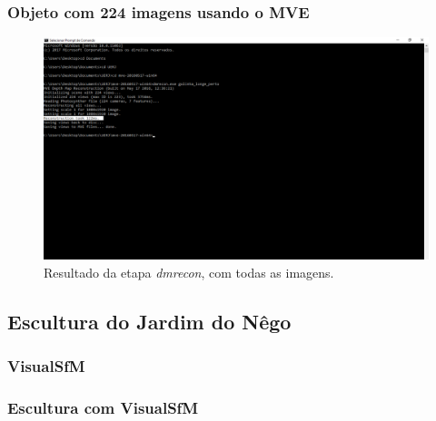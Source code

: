 \documentclass[table, usenames, svgnames, xcolor=dvipsnames]{beamer}
\begin{document}
\begin{frame}
\frametitle{\textbf{Objeto com 224 imagens usando o MVE}}
	\begin{figure}[!h]
			\centering
			\includegraphics[width=0.8\linewidth]{figs/mvedmrecongalinhapertolonge.png}
			\caption{%
			Resultado da etapa \protect\emph{dmrecon}, com todas as imagens.
			}
	\end{figure}
\end{frame}


\subsection{Escultura do Jardim do Nêgo}

\subsubsection{VisualSfM}

\begin{frame}
\frametitle{\textbf{Escultura com VisualSfM}}
	\begin{center}
	\end{center}
\end{frame}
\end{document}
